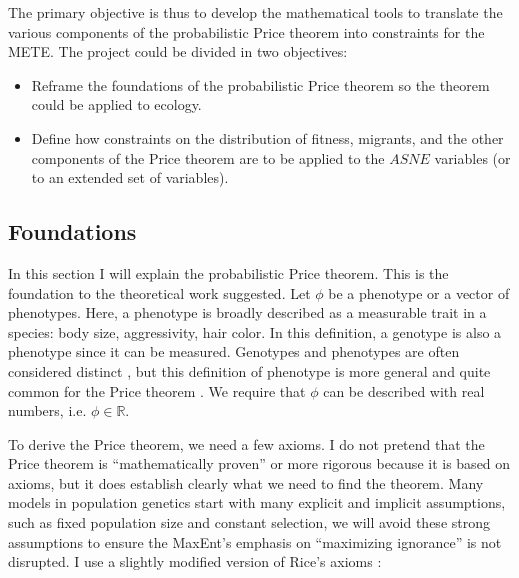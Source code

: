 \documentclass[letterpaper,12pt]{article}
\begin{document}
The primary objective is thus to develop the mathematical tools to
translate the various components of the probabilistic Price theorem into
constraints for the METE. The project could be divided in two objectives:

\begin{itemize}
  \item Reframe the foundations of the probabilistic Price theorem so the
  theorem could be applied to ecology.
  \item Define how constraints on the distribution of fitness, migrants, and
  the other components of the Price theorem are to be applied to the $ASNE$
  variables (or to an extended set of variables).
\end{itemize}

\subsection{Foundations}\label{pro:price}

In this section I will explain the probabilistic Price theorem. This is the
foundation to the theoretical work suggested. Let $\phi$ be a phenotype or a
vector of phenotypes. Here, a phenotype is broadly described as a measurable
trait in a species: body size, aggressivity, hair color. In this definition,
a genotype is also a phenotype since it can be measured. Genotypes and
phenotypes are often considered distinct \cite{gri08}, but this definition
of phenotype is more general and quite common for the Price theorem \cite
{ric04}. We require that $\phi$ can be described with real numbers, i.e.
$\phi \in \mathbb{R}$.

To derive the Price theorem, we need a few axioms. I do not pretend that the
Price theorem is ``mathematically proven'' or more rigorous because it is
based on axioms, but it does establish clearly what we need to find the
theorem. Many models in population genetics start with many explicit and
implicit assumptions, such as fixed population size and constant selection,
we will avoid these strong assumptions to ensure the MaxEnt's emphasis on
``maximizing ignorance'' \cite{jay03} is not disrupted. I use a slightly
modified version of Rice's axioms \cite{ric09}:
\end{document}
